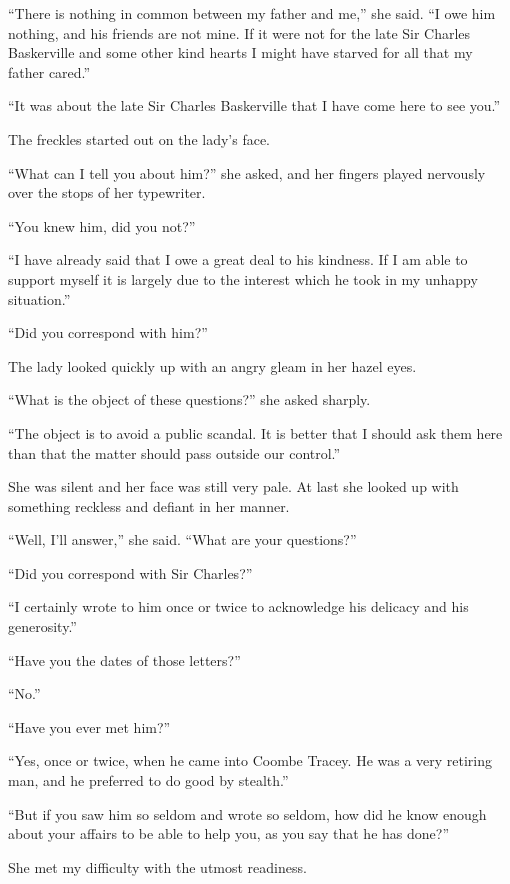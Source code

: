 \documentclass[paper=5.5in:8.5in,BCOR=7mm,twoside,DIV=calc,12pt,usegeometry,openany,chapterprefix,endperiod,headings=big]{scrbook} %
\begin{document}
\enquote{There is nothing in common between my father and me,} she said. \enquote{I owe him nothing, and his friends are not mine. If it were not for the late Sir Charles Baskerville and some other kind hearts I might have starved for all that my father cared.}

\enquote{It was about the late Sir Charles Baskerville that I have come here to see you.}

The freckles started out on the lady's face.

\enquote{What can I tell you about him?} she asked, and her fingers played nervously over the stops of her typewriter.

\enquote{You knew him, did you not?}

\enquote{I have already said that I owe a great deal to his kindness. If I am able to support myself it is largely due to the interest which he took in my unhappy situation.}

\enquote{Did you correspond with him?}

The lady looked quickly up with an angry gleam in her hazel eyes.

\enquote{What is the object of these questions?} she asked sharply.

\enquote{The object is to avoid a public scandal. It is better that I should ask them here than that the matter should pass outside our control.}

She was silent and her face was still very pale. At last she looked up with something reckless and defiant in her manner.

\enquote{Well, I'll answer,} she said. \enquote{What are your questions?}

\enquote{Did you correspond with Sir Charles?}

\enquote{I certainly wrote to him once or twice to acknowledge his delicacy and his generosity.}

\enquote{Have you the dates of those letters?}

\enquote{No.}

\enquote{Have you ever met him?}

\enquote{Yes, once or twice, when he came into Coombe Tracey. He was a very retiring man, and he preferred to do good by stealth.}

\enquote{But if you saw him so seldom and wrote so seldom, how did he know enough about your affairs to be able to help you, as you say that he has done?}

She met my difficulty with the utmost readiness.
\end{document}
